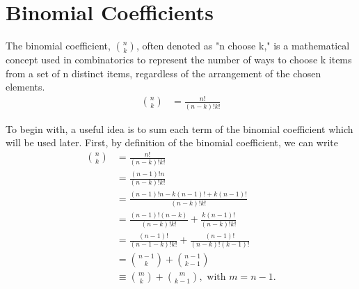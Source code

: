 \section{Binomial Coefficients}

\begin{defn}{1}
	The binomial coefficient, ${{n}\choose{k}}$, often denoted as "n choose k," is a mathematical concept used in combinatorics to represent the number of ways to choose k items from a set of n distinct items, regardless of the arrangement of the chosen elements. 	
	\begin{align}
		{{n}\choose{k}}&=\frac{n!}{(n-k)!k!}
	\end{align}
\end{defn}

To begin with, a useful idea is to sum each term of the binomial coefficient which will be used later. First, by definition of the binomial coefficient, we can write
\begin{align}
	{{n}\choose{k}}&=\frac{n!}{(n-k)!k!} \label{binomial-coefficient-defn}\\
	&=\frac{(n-1)!n}{(n-k)!k!}\\&
	=\frac{(n-1)!n-k(n-1)!+k(n-1)!}{(n-k)!k!}\\
	&=\frac{(n-1)!(n-k)}{(n-k)!k!}+\frac{k(n-1)!}{(n-k)!k!}\\
	&=\frac{(n-1)!}{(n-1-k)!k!}+\frac{(n-1)!}{(n-k)!(k-1)!}\\&={{n-1}\choose{k}}+{{n-1}\choose{k-1}} \label{n-1choosek+n-1choosek-1}\\
	&\equiv {{m}\choose{k}}+{{m}\choose{k-1}}, \textrm{ with }m=n-1.
\end{align} 


